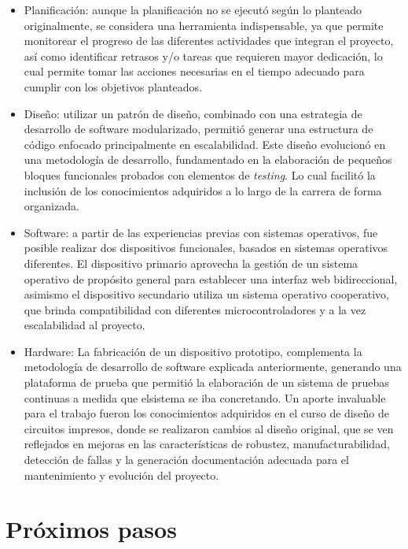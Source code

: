 \begin{itemize}
\item Planificación: aunque la planificación no se ejecutó según lo planteado originalmente, se considera una herramienta indispensable, ya que permite monitorear el progreso de las diferentes actividades que  integran el proyecto, así como identificar  retrasos  y/o  tareas que requieren mayor dedicación, lo cual permite  tomar las acciones necesarias en el tiempo adecuado para cumplir con los objetivos planteados.
\item Diseño: utilizar un patrón de diseño, combinado con una estrategia de desarrollo de software modularizado, permitió generar una estructura de código enfocado principalmente en escalabilidad. Este diseño evolucionó en una metodología de desarrollo, fundamentado en la elaboración de pequeños bloques funcionales probados con elementos de  \textit{testing}. Lo cual facilitó la inclusión de los conocimientos adquiridos a lo largo de la carrera de forma organizada.  
\item Software: a partir de las experiencias previas con sistemas operativos, fue posible realizar dos dispositivos funcionales, basados en sistemas operativos diferentes. El dispositivo primario aprovecha la gestión de un sistema operativo de propósito general para establecer una interfaz web bidireccional, asimismo el dispositivo secundario utiliza un sistema operativo cooperativo, que brinda compatibilidad con diferentes microcontroladores y a la vez escalabilidad al proyecto.   
\item Hardware: La fabricación de un dispositivo prototipo, complementa la metodología de desarrollo de software explicada anteriormente, generando una plataforma de prueba que permitió la elaboración de un sistema de pruebas continuas a medida que elsistema se iba concretando. Un aporte invaluable para el trabajo fueron los conocimientos adquiridos en el curso de diseño de circuitos impresos, donde se realizaron cambios al diseño original, que se ven reflejados en mejoras en las características de robustez, manufacturabilidad, detección de fallas y la generación documentación adecuada para el mantenimiento y evolución del proyecto. 
\end{itemize}


\section{Próximos pasos}

